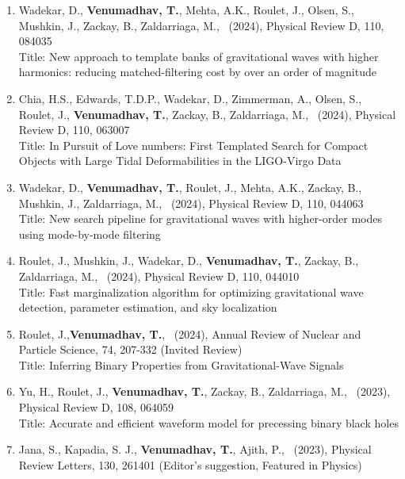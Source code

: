 \documentclass{article}
\newcommand{\prd}{Physical Review D}
\newcommand{\prl}{Physical Review Letters}
\newlength{\cvindent}
\newenvironment{cvblock}{\noindent\hspace*{\cvindent}\begin{minipage}{\dimexpr\textwidth-\cvindent\relax}}{\end{minipage}\par}
\begin{document}
\begin{cvblock}
\begin{enumerate}
	      \item Wadekar, D., \textbf{Venumadhav, T.}, Mehta, A.K., Roulet, J., Olsen, S., Mushkin, J., Zackay, B., Zaldarriaga, M., \ (2024), \prd, 110, 084035 \\
	      Title: New approach to template banks of gravitational waves with higher harmonics: reducing matched-filtering cost by over an order of magnitude
	      \item Chia, H.S., Edwards, T.D.P., Wadekar, D., Zimmerman, A., Olsen, S., Roulet, J., \textbf{Venumadhav, T.}, Zackay, B., Zaldarriaga, M., \ (2024), \prd, 110, 063007 \\
	      Title: In Pursuit of Love numbers: First Templated Search for Compact Objects with Large Tidal Deformabilities in the LIGO-Virgo Data
	      \item Wadekar, D., \textbf{Venumadhav, T.}, Roulet, J., Mehta, A.K., Zackay, B., Mushkin, J., Zaldarriaga, M., \ (2024), \prd, 110, 044063 \\
	      Title: New search pipeline for gravitational waves with higher-order modes using mode-by-mode filtering
	      \item Roulet, J., Mushkin, J., Wadekar, D., \textbf{Venumadhav, T.}, Zackay, B., Zaldarriaga, M., \ (2024), \prd, 110, 044010 \\
	      Title: Fast marginalization algorithm for optimizing gravitational wave detection, parameter estimation, and sky localization
	      \item Roulet, J.,\textbf{Venumadhav, T.}, \ (2024), Annual Review of Nuclear and Particle Science, 74, 207-332 (Invited Review) \\
	      Title: Inferring Binary Properties from Gravitational-Wave Signals
	      \item Yu, H., Roulet, J., \textbf{Venumadhav, T.}, Zackay, B., Zaldarriaga, M., \ (2023), \prd, 108, 064059 \\
	      Title: Accurate and efficient waveform model for precessing binary black holes
	      \item Jana, S., Kapadia, S. J., \textbf{Venumadhav, T.}, Ajith, P., \ (2023), \prl, 130, 261401 (Editor’s suggestion, Featured in Physics) \\

\end{enumerate}
\end{cvblock}
\end{document}
